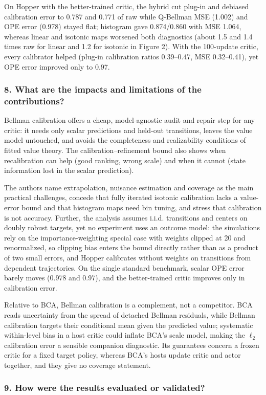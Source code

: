 \documentclass[11pt]{article}
\newcommand{\question}[1]{\subsubsection*{#1}}
\begin{document}
On Hopper with the better-trained critic, the hybrid cut plug-in and debiased calibration error to 0.787 and 0.771 of raw while Q-Bellman MSE (1.002) and OPE error (0.978) stayed flat; histogram gave 0.874/0.860 with MSE 1.064, whereas linear and isotonic maps worsened both diagnostics (about 1.5 and 1.4 times raw for linear and 1.2 for isotonic in Figure 2). With the 100-update critic, every calibrator helped (plug-in calibration ratios 0.39--0.47, MSE 0.32--0.41), yet OPE error improved only to 0.97.

\question{8. What are the impacts and limitations of the contributions?}

Bellman calibration offers a cheap, model-agnostic audit and repair step for any critic: it needs only scalar predictions and held-out transitions, leaves the value model untouched, and avoids the completeness and realizability conditions of fitted value theory. The calibration--refinement bound also shows when recalibration can help (good ranking, wrong scale) and when it cannot (state information lost in the scalar prediction).

The authors name extrapolation, nuisance estimation and coverage as the main practical challenges, concede that fully iterated isotonic calibration lacks a value-error bound and that histogram maps need bin tuning, and stress that calibration is not accuracy. Further, the analysis assumes i.i.d. transitions and centers on doubly robust targets, yet no experiment uses an outcome model: the simulations rely on the importance-weighting special case with weights clipped at 20 and renormalized, so clipping bias enters the bound directly rather than as a product of two small errors, and Hopper calibrates without weights on transitions from dependent trajectories. On the single standard benchmark, scalar OPE error barely moves (0.978 and 0.97), and the better-trained critic improves only in calibration error.

Relative to BCA, Bellman calibration is a complement, not a competitor. BCA reads uncertainty from the spread of detached Bellman residuals, while Bellman calibration targets their conditional mean given the predicted value; systematic within-level bias in a host critic could inflate BCA's scale model, making the $\ell_2$ calibration error a sensible companion diagnostic. Its guarantees concern a frozen critic for a fixed target policy, whereas BCA's hosts update critic and actor together, and they give no coverage statement.

\question{9. How were the results evaluated or validated?}
\end{document}

